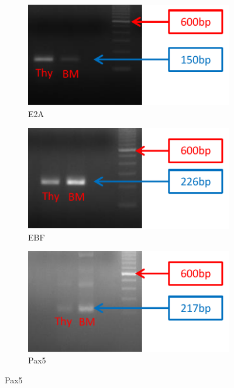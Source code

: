 \begin{figure}
	\begin{subfigure}{0.5\textwidth}
	\centering
	\caption{E2A}
	\includegraphics[width=\textwidth]{Figures/E2A.pdf}
	\end{subfigure}
	\begin{subfigure}{0.5\textwidth}
	\centering
	\caption{EBF}
	\includegraphics[width=\textwidth]{Figures/EBF.pdf}
	\end{subfigure}
	\begin{subfigure}{0.5\textwidth}
	\centering
	\caption{Pax5}
	\includegraphics[width=\textwidth]{Figures/sPax5.pdf}
	\end{subfigure}

\end{figure}
